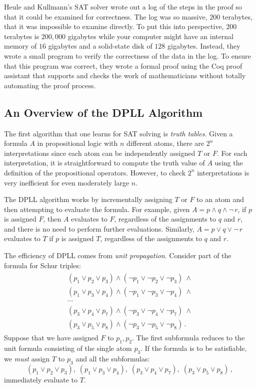 Heule and Kullmann's SAT solver wrote out a log of the steps in the proof so that it could be examined for correctness. The log was so massive, $200$ terabytes, that it was impossible to examine directly. To put this into perspective, $200$ terabytes is $200,\!000$ gigabytes while your computer might have an internal memory of $16$ gigabytes and a solid-state disk of $128$ gigabytes. Instead, they wrote a small program to verify the correctness of the data in the log. To ensure that this program was correct, they wrote a formal proof using the Coq proof assistant that supports and checks the work of mathematicians without totally automating the proof process.

\subsection{An Overview of the DPLL Algorithm}

The first algorithm that one learns for SAT solving is \emph{truth tables}. Given a formula $A$ in propositional logic with $n$ different atoms, there are $2^n$ interpretations since each atom can be independently assigned $T$ or $F$. For each interpretation, it is straightforward to compute the truth value of $A$ using the definition of the propositional operators. However, to check $2^n$ interpretations is very inefficient for even moderately large $n$.

The DPLL algorithm works by incrementally assigning $T$ or $F$ to an atom and then attempting to evaluate the formula. For example, given $A=p \wedge q \wedge \neg\, r$, if $p$ is assigned $F$, then $A$ evaluates to $F$, regardless of the assignments to $q$ and $r$, and there is no need to perform further evaluations. Similarly, $A=p\vee q \vee \neg\, r$ evaluates to $T$ if $p$ is assigned $T$, regardless of the assignments to $q$ and $r$.

The efficiency of DPLL comes from \emph{unit propagation}. Consider part of the formula for Schur triples:
\begin{align}
\begin{array}{l}\label{eq.schur3}
(p_1 \vee p_2 \vee p_3) \wedge (\neg p_1 \vee \neg p_2 \vee \neg p_3) \:\wedge \\
(p_1 \vee p_3 \vee p_4) \wedge (\neg p_1 \vee \neg p_3 \vee \neg p_4) \:\wedge \\
\cdots\\
(p_3 \vee p_4 \vee p_7) \wedge (\neg p_3 \vee \neg p_4 \vee \neg p_7) \:\wedge \\
(p_3 \vee p_5 \vee p_8) \wedge (\neg p_3 \vee \neg p_5 \vee \neg p_8)\,.
\end{array}
\end{align}
Suppose that we have assigned $F$ to $p_1,p_2$. The first subformula reduces to the unit formula consisting of the single atom $p_3$. If the formula is to be satisfiable, we \emph{must} assign $T$ to $p_3$ and all the subformulas:
\[
(p_1 \vee p_2 \vee p_3),\;(p_1 \vee p_3 \vee p_4),\;
(p_3 \vee p_4 \vee p_7),\;(p_3 \vee p_5 \vee p_8)\,,
\]
immediately evaluate to $T$.

